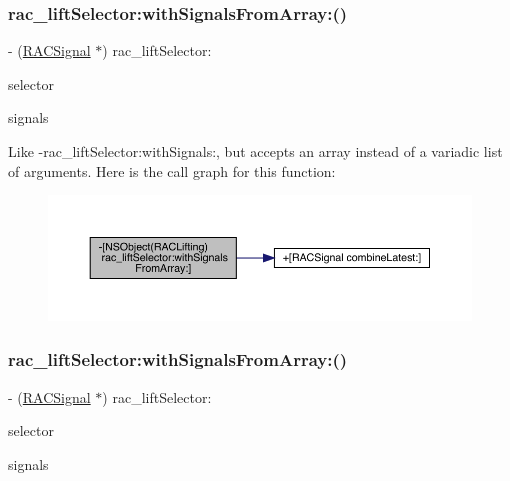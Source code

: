 \subsubsection{\texorpdfstring{rac\+\_\+lift\+Selector\+:with\+Signals\+From\+Array\+:()}{rac\_liftSelector:withSignalsFromArray:()}\hspace{0.1cm}{\footnotesize\ttfamily [1/3]}}
{\footnotesize\ttfamily -\/ (\mbox{\hyperlink{interface_r_a_c_signal}{R\+A\+C\+Signal}} $\ast$) rac\+\_\+lift\+Selector\+: \begin{DoxyParamCaption}\item[{(S\+EL)}]{selector }\item[{withSignalsFromArray:(N\+S\+Array $\ast$)}]{signals }\end{DoxyParamCaption}}

Like -\/rac\+\_\+lift\+Selector\+:with\+Signals\+:, but accepts an array instead of a variadic list of arguments. Here is the call graph for this function\+:\nopagebreak
\begin{figure}[H]
\begin{center}
\leavevmode
\includegraphics[width=350pt]{category_n_s_object_07_r_a_c_lifting_08_aaad9d62eb1d7eceaeb8bbf5d2280f636_cgraph}
\end{center}
\end{figure}
\mbox{\label{category_n_s_object_07_r_a_c_lifting_08_aaad9d62eb1d7eceaeb8bbf5d2280f636}} 
\subsubsection{\texorpdfstring{rac\+\_\+lift\+Selector\+:with\+Signals\+From\+Array\+:()}{rac\_liftSelector:withSignalsFromArray:()}\hspace{0.1cm}{\footnotesize\ttfamily [2/3]}}
{\footnotesize\ttfamily -\/ (\mbox{\hyperlink{interface_r_a_c_signal}{R\+A\+C\+Signal}} $\ast$) rac\+\_\+lift\+Selector\+: \begin{DoxyParamCaption}\item[{(S\+EL)}]{selector }\item[{withSignalsFromArray:(N\+S\+Array $\ast$)}]{signals }\end{DoxyParamCaption}}

